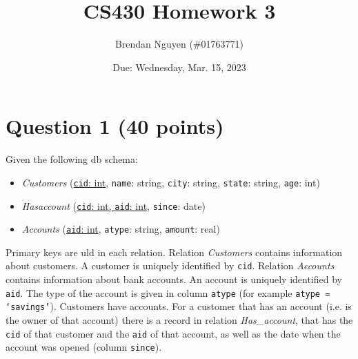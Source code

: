 \documentclass[letterpaper, 11pt]{article}
\title{CS430 Homework 3}
\author{Brendan Nguyen (\#01763771)}
\date{Due: Wednesday, Mar. 15, 2023}
\begin{document}
\maketitle

\section*{Question 1 (40 points)}

Given the following db schema:
\begin{itemize}
    \item \textit{Customers} (\ul{\texttt{cid}: int}, \texttt{name}: string, \texttt{city}: string, \texttt{state}: string, \texttt{age}: int)
    \item \textit{Has\textunderscore account} (\ul{\texttt{cid}: int, \texttt{aid}: int}, \texttt{since}: date)
    \item \textit{Accounts} (\ul{\texttt{aid}: int}, \texttt{atype}: string, \texttt{amount}: real)
\end{itemize}

Primary keys are uld in each relation. Relation \textit{Customers} contains information about customers. A customer is uniquely identified by \texttt{cid}. Relation \textit{Accounts} contains information about bank accounts. An account is uniquely identified by \texttt{aid}. The type of the account is given in column \texttt{atype} (for example  \texttt{atype = `savings'}).  Customers have accounts. For a customer that has an account (i.e. is the owner of that account) there is a record in relation \textit{Has\_account}, that has the \texttt{cid} of that customer and the \texttt{aid} of that account, as well as the date when the account was opened (column \texttt{since}).
\end{document}
